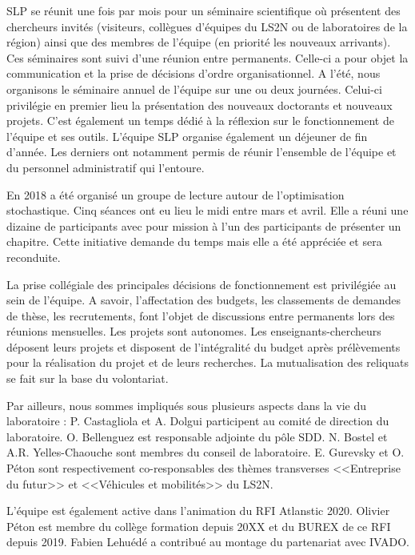 SLP se réunit une fois par mois pour un séminaire scientifique où présentent des chercheurs invités (visiteurs, collègues d'équipes du LS2N ou de laboratoires de la région) ainsi que des membres de l'équipe (en priorité les nouveaux arrivants). 
Ces séminaires sont suivi d'une réunion entre permanents. Celle-ci a pour objet la communication et la prise de décisions d'ordre organisationnel. 
A l'été, nous organisons le séminaire annuel de l'équipe sur une ou deux journées.
Celui-ci  privilégie en premier lieu la présentation des nouveaux doctorants et nouveaux projets. C'est également un temps dédié à la réflexion sur le fonctionnement de l'équipe et ses outils.
L'équipe SLP organise également un déjeuner de fin d'année. Les derniers ont notamment permis de réunir l'ensemble de l'équipe et du personnel administratif qui l'entoure.

En 2018 a été organisé un groupe de lecture autour de l'optimisation stochastique. Cinq séances ont eu lieu le midi entre mars et avril. Elle a réuni une dizaine de participants avec pour mission à l'un des participants de présenter un chapitre. Cette initiative demande du temps mais elle a été appréciée et sera reconduite.

La prise collégiale des principales décisions de fonctionnement est privilégiée au sein de l'équipe. A savoir, l'affectation des budgets, les classements de demandes de thèse, les recrutements, font l'objet de discussions entre permanents lors des réunions mensuelles. 
Les projets sont autonomes. Les enseignants-chercheurs déposent leurs projets et disposent de l'intégralité du budget après prélèvements pour la réalisation du projet et de leurs recherches. La mutualisation des reliquats se fait sur la base du volontariat.

Par ailleurs, nous sommes impliqués sous plusieurs aspects dans la vie du laboratoire :
P. Castagliola et A. Dolgui participent au comité de direction du laboratoire. 
O. Bellenguez est responsable adjointe du pôle SDD. 
N. Bostel et A.R. Yelles-Chaouche sont membres du conseil de laboratoire. 
E. Gurevsky et O. Péton sont respectivement co-responsables des thèmes transverses <<Entreprise du futur>> et <<Véhicules et mobilités>> du LS2N. 

L'équipe est également active dans l'animation du RFI Atlanstic 2020. Olivier Péton est membre du collège formation depuis 20XX et du BUREX de ce RFI depuis 2019. Fabien Lehuédé a contribué au montage du partenariat avec IVADO. 

